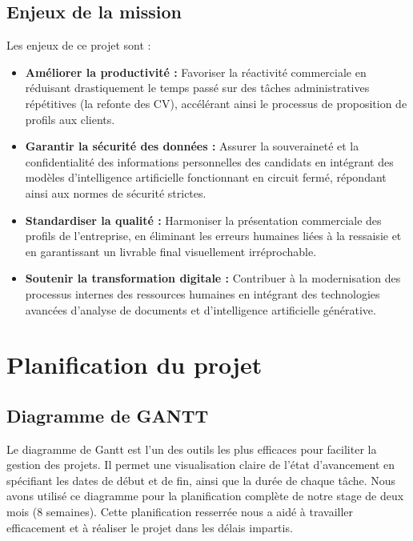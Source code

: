 \subsection{Enjeux de la mission}
Les enjeux de ce projet sont :
\begin{itemize}
    \item \textbf{Améliorer la productivité :} Favoriser la réactivité commerciale en réduisant drastiquement le temps passé sur des tâches administratives répétitives (la refonte des CV), accélérant ainsi le processus de proposition de profils aux clients.
    \item \textbf{Garantir la sécurité des données :} Assurer la souveraineté et la confidentialité des informations personnelles des candidats en intégrant des modèles d'intelligence artificielle fonctionnant en circuit fermé, répondant ainsi aux normes de sécurité strictes.
    \item \textbf{Standardiser la qualité :} Harmoniser la présentation commerciale des profils de l'entreprise, en éliminant les erreurs humaines liées à la ressaisie et en garantissant un livrable final visuellement irréprochable.
    \item \textbf{Soutenir la transformation digitale :} Contribuer à la modernisation des processus internes des ressources humaines en intégrant des technologies avancées d'analyse de documents et d'intelligence artificielle générative.
\end{itemize}


\section{Planification du projet}

\subsection{Diagramme de GANTT}
Le diagramme de Gantt est l'un des outils les plus efficaces pour faciliter la gestion des projets. Il permet une visualisation claire de l'état d'avancement en spécifiant les dates de début et de fin, ainsi que la durée de chaque tâche. Nous avons utilisé ce diagramme pour la planification complète de notre stage de deux mois (8 semaines). Cette planification resserrée nous a aidé à travailler efficacement et à réaliser le projet dans les délais impartis.

